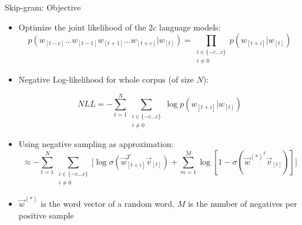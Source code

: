 
\begin{vbframe}{Skip-gram: Objective}

\vfill

\footnotesize
\begin{itemize}
	\item Optimize the joint likelihood of the $2c$ language models:
	$$p (w_{[t-c]} \dots w_{[t-1]} w_{[t+1]} \dots w_{[t+c]}|w_{[t]}) = \prod_{\substack{i \in  \{-c \ldots c\}\\ i \neq 0}} p(w_{[t+i]}|w_{[t]})$$
	
	\item Negative Log-likelihood for whole corpus (of size $N$):
	
	$$NLL = - \sum_{t=1}^N \sum_{\substack{i \in  \{-c \ldots c\}\\ i \neq 0}} \log p (w_{[t+i]}|w_{[t]})$$

	\item Using negative sampling as approximation:
		$$\approx - \sum_{t=1}^N \sum_{\substack{i \in  \{-c \ldots c\}\\ i \neq 0}} \Big[ \log \sigma(\vec w_{[t+i]}^T \vec v_{[t]}) + \sum_{m=1}^{M} \log [1-\sigma(\vec w^{{(*)}^T} \vec v_{[t]})]\Big] $$
	\item $\vec w^{(*)}$ is the word vector of a random word, $M$ is the number of negatives per positive sample
\end{itemize}

\vfill

\end{vbframe}


